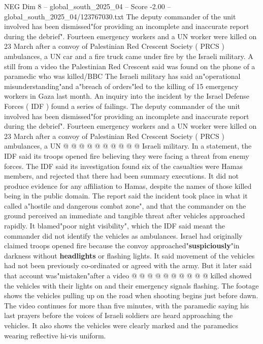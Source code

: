 \begin{textsample}{NEG Dim 8 – global\_south\_2025\_04 – Score -2.00 – global\_south\_2025\_04/123767030.txt}  \label{ex:f8_neg_042}
The deputy commander of the unit involved has been dismissed"for providing an incomplete and inaccurate report during the debrief".
Fourteen emergency workers and a UN worker were killed on 23 March after a convoy of Palestinian Red Crescent Society ( PRCS ) ambulances, a UN car and a fire truck came under fire by the Israeli military.
A still from a video the Palestinian Red Crescent said was found on the phone of a paramedic who was killed/BBC The Israeli military has said an"operational misunderstanding"and a"breach of orders"led to the killing of 15 emergency workers in Gaza last month.
An inquiry into the incident by the Israel Defense Forces ( IDF ) found a series of failings.
The deputy commander of the unit involved has been dismissed"for providing an incomplete and inaccurate report during the debrief".
Fourteen emergency workers and a UN worker were killed on 23 March after a convoy of Palestinian Red Crescent Society ( PRCS ) ambulances, a UN @ @ @ @ @ @ @ @ @ @ Israeli military.
In a statement, the IDF said its troops opened fire believing they were facing a threat from enemy forces.
The IDF said its investigation found six of the casualties were Hamas members, and rejected that there had been summary executions.
It did not produce evidence for any affiliation to Hamas, despite the names of those killed being in the public domain.
The report said the incident took place in what it called a"hostile and dangerous combat zone", and that the commander on the ground perceived an immediate and tangible threat after vehicles approached rapidly.
It blamed"poor night visibility", which the IDF said meant the commander did not identify the vehicles as ambulances.
Israel had originally claimed troops opened fire because the convoy approached"\textbf{suspiciously}"in darkness without \textbf{headlights} or flashing lights.
It said movement of the vehicles had not been previously co-ordinated or agreed with the army.
But it later said that account was"mistaken"after a video @ @ @ @ @ @ @ @ @ @ killed showed the vehicles with their lights on and their emergency signals flashing.
The footage shows the vehicles pulling up on the road when shooting begins just before dawn.
The video continues for more than five minutes, with the paramedic saying his last prayers before the voices of Israeli soldiers are heard approaching the vehicles.
It also shows the vehicles were clearly marked and the paramedics wearing reflective hi-vis uniform.

\end{textsample}
